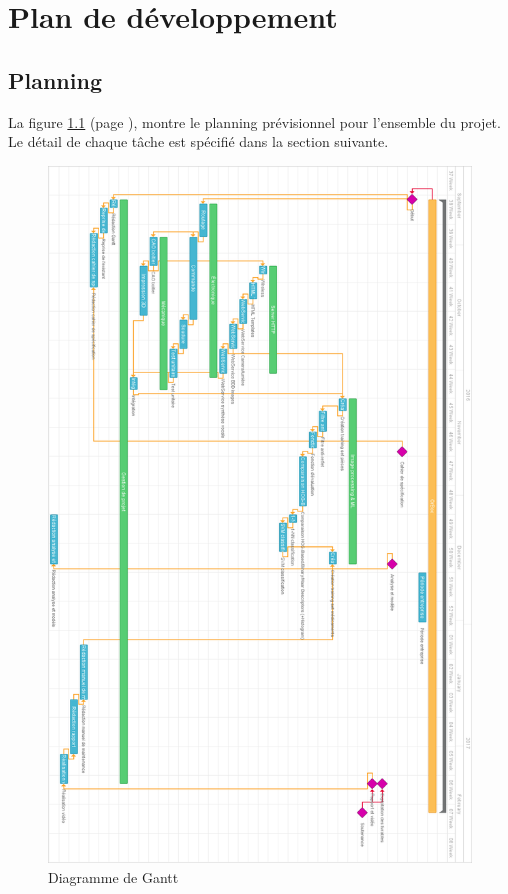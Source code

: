 
\chapter{Plan de développement}

\section{Planning}

\par
La figure \ref{gantt} (page \pageref{gantt}), montre le planning prévisionnel pour l'ensemble du projet.
Le détail de chaque tâche est spécifié dans la section suivante.

\begin{figure}[p]
\vspace*{-2.5cm}
\centerline{
\includegraphics[width=\textwidth]{img/gantt.png}
}
\caption{Diagramme de Gantt}
\label{gantt}
\end{figure}

